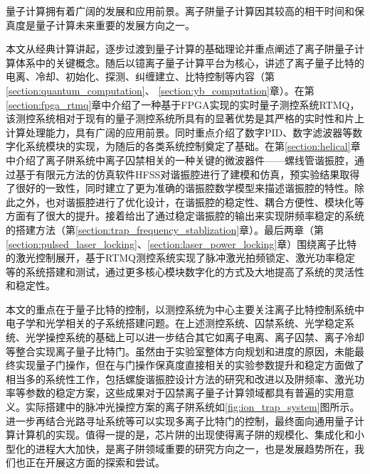 
\begin{conclusion}

量子计算拥有着广阔的发展和应用前景。离子阱量子计算因其较高的相干时间和保真度是量子计算未来重要的发展方向之一。

本文从经典计算讲起，逐步过渡到量子计算的基础理论并重点阐述了离子阱量子计算体系中的关键概念。随后以镱离子量子计算平台为核心，讲述了离子量子比特的电离、冷却、初始化、探测、纠缠建立、比特控制等内容（第\ref{section:quantum_computation}、
\ref{section:yb_computation}章）。在第\ref{section:fpga_rtmq}章中介绍了一种基于FPGA实现的实时量子测控系统RTMQ，该测控系统相对于现有的量子测控系统所具有的显著优势是其严格的实时性和片上计算处理能力，具有广阔的应用前景。同时重点介绍了数字PID、数字滤波器等数字化系统模块的实现，为随后的各类系统控制奠定了基础。在第\ref{section:helical}章中介绍了离子阱系统中离子囚禁相关的一种关键的微波器件——螺线管谐振腔，通过基于有限元方法的仿真软件HFSS对谐振腔进行了建模和仿真，预实验结果取得了很好的一致性，同时建立了更为准确的谐振腔数学模型来描述谐振腔的特性。除此之外，也对谐振腔进行了优化设计，在谐振腔的稳定性、耦合方便性、模块化等方面有了很大的提升。接着给出了通过稳定谐振腔的输出来实现阱频率稳定的系统的搭建方法（第\ref{section:trap_frequency_stablization}章）。最后两章（第\ref{section:pulsed_laser_locking}、\ref{section:laser_power_locking}章）围绕离子比特的激光控制展开，基于RTMQ测控系统实现了脉冲激光拍频锁定、激光功率稳定等的系统搭建和测试，通过更多核心模块数字化的方式及大地提高了系统的灵活性和稳定性。

本文的重点在于量子比特的控制，以测控系统为中心主要关注离子比特控制系统中电子学和光学相关的子系统搭建问题。在上述测控系统、囚禁系统、光学稳定系统、光学操控系统的基础上可以进一步结合其它如离子电离、离子囚禁、离子冷却等整合实现离子量子比特门。虽然由于实验室整体方向规划和进度的原因，未能最终实现量子门操作，但在与门操作保真度直接相关的实验参数提升和稳定方面做了相当多的系统性工作，包括螺旋谐振腔设计方法的研究和改进以及阱频率、激光功率等参数的稳定方案，这些成果对于囚禁离子量子计算领域都具有普遍的实用意义。实际搭建中的脉冲光操控方案的离子阱系统如\ref{fig:ion_trap_system}图所示。进一步再结合光路寻址系统等可以实现多离子比特门的控制，最终面向通用量子计算计算机的实现。值得一提的是，芯片阱的出现使得离子阱的规模化、集成化和小型化的进程大大加快，是离子阱领域重要的研究方向之一，也是发展趋势所在，我们也正在开展这方面的探索和尝试。



\end{conclusion}


